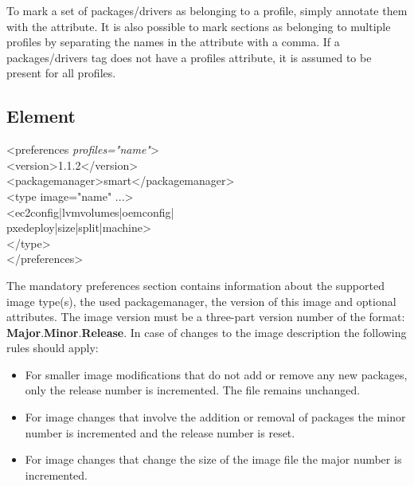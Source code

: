 To mark a set of packages/drivers as belonging to a profile, simply
annotate them with the  attribute. It is also possible
to mark sections as belonging to multiple profiles by separating the
names in the  attribute with a comma.
If a packages/drivers tag does not have a profiles attribute, it is
assumed to be present for all profiles.

\subsection{ Element}
\begin{Command}{14cm}
<preferences \textit{profiles="name"}>\\
\hspace*{1cm}<version>1.1.2</version>\\
\hspace*{1cm}<packagemanager>smart</packagemanager>\\
\hspace*{1cm}<type image="name" ...>\\
\hspace*{2cm}<ec2config|lvmvolumes|oemconfig|\\
\hspace*{2cm} pxedeploy|size|split|machine>\\
\hspace*{1cm}</type>\\
</preferences>
\end{Command}

The mandatory preferences section contains information about the supported
image type(s), the used packagemanager, the version of this image and
optional attributes. The image version must be a three-part version number of
the format: \textbf{Major}.\textbf{Minor}.\textbf{Release}. In case of
changes to the image description the following rules should apply:

\begin{itemize}
\item For smaller image modifications that do not add or remove any
      new packages, only the release number is incremented.
      The  file remains unchanged.
\item For image changes that involve the addition or removal of packages
      the minor number is incremented and the release number is reset.
\item For image changes that change the size of the image file
      the major number is incremented.
\end{itemize}

